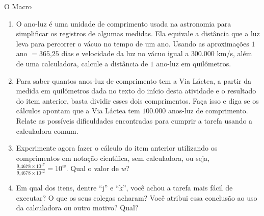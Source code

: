 \begin{task}{O Macro}
\begin{enumerate}
\item {} 
O ano-luz é uma unidade de comprimento usada na astronomia para simplificar os registros de algumas medidas. Ela equivale a distância que a luz leva para percorrer o vácuo no tempo de um ano. Usando as aproximações $1$ ano $= 365\text{,}25$ dias e velocidade da luz no vácuo igual a $300.000$ km/s, além de uma calculadora, calcule a distância de $1$ ano-luz em quilômetros.

\item {} 
Para saber quantos anos-luz de comprimento tem a Via Láctea, a partir da medida em quilômetros dada no texto do início desta atividade e o resultado do item anterior, basta dividir esses dois comprimentos. Faça isso e diga se os cálculos apontam que a Via Láctea tem $100.000$ anos-luz de comprimento. Relate as possíveis dificuldades encontradas para cumprir a tarefa usando a calculadora comum.

\item {} 
Experimente agora fazer o cálculo do item anterior utilizando os comprimentos em notação científica, sem calculadora, ou seja, $\displaystyle\frac{9\text{,}4678 \times 10^{17}}{9\text{,}4678 \times 10^{12}}=10^w$. Qual o valor de $w$?

\item {} 
Em qual dos itens, dentre “j” e “k”, você achou a tarefa mais fácil de executar? O que os seus colegas acharam? Você atribui essa conclusão ao uso da calculadora ou outro motivo? Qual?

\end{enumerate}
\end{task}


